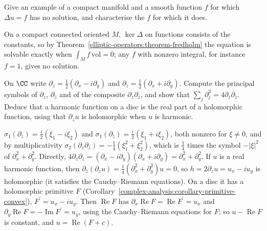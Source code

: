 \begin{exercise}\label{elliptic-operators:exercise-no-solutions}
Give an example of a compact manifold and a smooth function $f$ for which $\Delta u = f$ has no solution, and characterise the $f$ for which it does.
\end{exercise}

\begin{solution}
On a compact connected oriented $M$, $\ker\Delta$ on functions consists of the constants, so by Theorem~\ref{elliptic-operators:theorem-fredholm} the equation is solvable exactly when
$\int_Mf\,\mathrm{vol} = 0$; any $f$ with nonzero integral, for instance $f = 1$, gives no solution.
\end{solution}

\begin{exercise}\label{elliptic-operators:exercise-cauchy-riemann}
On $\CC$ write $\partial_z = \frac12(\partial_x - i\partial_y)$ and $\partial_{\bar z} = \frac12(\partial_x + i\partial_y)$. Compute the principal symbols of $\partial_z$, $\partial_{\bar z}$ and of the composite
$\partial_z\partial_{\bar z}$, and show that $\sum_j\partial_j^2 = 4\partial_z\partial_{\bar z}$. Deduce that a harmonic function on a disc is the real part of a holomorphic function, using that
$\partial_zu$ is holomorphic when $u$ is harmonic.
\end{exercise}

\begin{solution}
$\sigma_1(\partial_z) = \frac i2(\xi_1 - i\xi_2)$ and $\sigma_1(\partial_{\bar z}) = \frac i2(\xi_1 + i\xi_2)$, both nonzero for $\xi \neq 0$, and by multiplicativity
$\sigma_2(\partial_z\partial_{\bar z}) = -\frac14(\xi_1^2 + \xi_2^2)$, which is $\frac14$ times the symbol $-|\xi|^2$ of $\partial_x^2 + \partial_y^2$. Directly,
$4\partial_z\partial_{\bar z} = (\partial_x - i\partial_y)(\partial_x + i\partial_y) = \partial_x^2 + \partial_y^2$. If $u$ is a real harmonic function, then $\partial_{\bar z}(\partial_zu) = \frac14(\partial_x^2 + \partial_y^2)u = 0$,
so $h = 2\partial_zu = u_x - iu_y$ is holomorphic (it satisfies the Cauchy--Riemann equations). On a disc it has a holomorphic primitive $F$ (Corollary~\ref{complex-analysis:corollary-primitive-convex}),
$F^{\prime} = u_x - iu_y$. Then $\operatorname{Re}F$ has $\partial_x\operatorname{Re}F = \operatorname{Re}F^{\prime} = u_x$ and $\partial_y\operatorname{Re}F = -\operatorname{Im}F^{\prime} = u_y$, using the Cauchy--Riemann
equations for $F$; so $u - \operatorname{Re}F$ is constant, and $u = \operatorname{Re}(F + c)$.
\end{solution}

